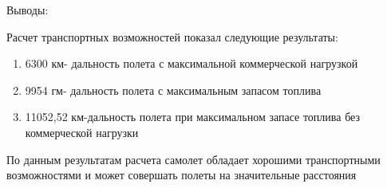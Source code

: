\begin{center}
    Выводы:
\end{center}

Расчет транспортных возможностей показал следующие результаты:
\begin{enumerate}
    \item 6300 км- дальность полета с максимальной коммерческой нагрузкой
    \item 9954 гм- дальность полета с максимальным запасом топлива
    \item 11052,52 км-дальность полета при максимальном запасе топлива без
коммерческой нагрузки
\end{enumerate}

По данным результатам расчета самолет обладает хорошими транспортными
возможностями и может совершать полеты на значительные расстояния 


